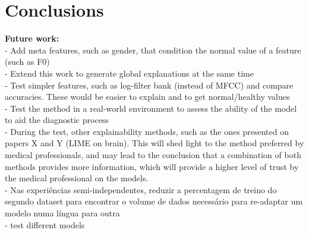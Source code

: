 
\chapter{Conclusions}
\label{ch:magna}



\textbf{Future work: }\\
 - Add meta features, such as gender, that condition the normal value of a feature (such as F0) \\
 - Extend this work to generate global explanations at the same time \\
 - Test simpler features, such as log-filter bank (instead of MFCC) and compare accuracies. These would be easier to explain and to get normal/healthy values \\
 - Test the method in a real-world environment to assess the ability of the model to aid the diagnostic process \\
 - During the test, other explainability methods, such as the ones presented on papers X and Y (LIME on brain). This will shed light to the method preferred by medical professionals, and may lead to the conclusion that a combination of both methods provides more information, which will provide a higher level of trust by the medical professional on the models.\\
 - Nas experiências semi-independentes, reduzir a percentagem de treino do segundo dataset para encontrar o volume de dados necessário para re-adaptar um modelo numa língua para outra \\
 - test different models

